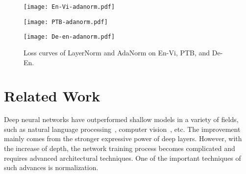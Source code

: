 \documentclass{article}
\begin{document}
\begin{figure}[h]

\centering
\small

\begin{minipage}{0.32\textwidth}
  \centering
  \texttt{[image: En-Vi-adanorm.pdf]}
\end{minipage}
\begin{minipage}{.32\textwidth}
  \centering
  \texttt{[image: PTB-adanorm.pdf]}
\end{minipage}
\begin{minipage}{.32\textwidth}
  \centering
  \texttt{[image: De-en-adanorm.pdf]}
\end{minipage}\caption{Loss curves of LayerNorm and AdaNorm on En-Vi, PTB, and De-En.}

\label{fig:test2}
\end{figure}




 













  





























\section{Related Work}

Deep neural networks have outperformed shallow models in a variety of fields, such as natural language processing~\citep{sutskever2014sequence,bahdanau2014neural, devlin2018bert}, computer vision~\citep{he2016deep,huang2017densely}, etc. The improvement mainly comes from the stronger expressive power of deep layers. However, with the increase of depth, the network training process becomes complicated and requires advanced architectural techniques. One of the important techniques of such advances is normalization.   
\end{document}
